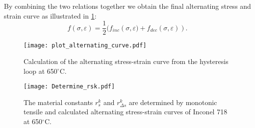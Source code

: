 By combining the two relations together we obtain the final alternating stress and strain curve as illustrated in \ref{Fig:Alternating_Curve}:
\begin{equation}
f(\sigma,\varepsilon)=\frac{1}{2}(f_{inc}\left(\sigma,\varepsilon)+f_{dec}(\sigma,\varepsilon)\right).
\end{equation}
\begin{figure}[!htp]
\centering
\texttt{[image: plot\_alternating\_curve.pdf]}
\caption{Calculation of the alternating stress-strain curve from the hysteresis loop at 650$^{\circ}$C.}
\label{Fig:Alternating_Curve}
\end{figure}
\begin{figure}[!htp]
\centering
\texttt{[image: Determine\_rsk.pdf]}
\caption{The material constants $r_s^k$ and $r_{\Delta s}^k$ are determined by monotonic tensile and calculated alternating stress-strain curves of Inconel 718 at 650$^{\circ}$C.}
\label{Fig:Determine_rsk}
\end{figure}

